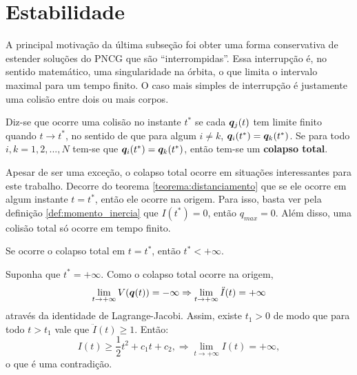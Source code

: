 \section{Estabilidade}

A principal motivação da última subseção foi obter uma forma conservativa de estender soluções do PNCG que são ``interrompidas''. Essa interrupção é, no sentido matemático, uma singularidade na órbita, o que limita o intervalo maximal para um tempo finito. O caso mais simples de interrupção é justamente uma colisão entre dois ou mais corpos.

\begin{definition}[Colisão]
    Diz-se que ocorre uma colisão no instante $t^*$ se cada $\bm q_j(t)$ tem limite finito quando $t \to t^*$, no sentido de que para algum $i \neq k$, $\bm q_i(t^*) = \bm q_k(t^*)$. Se para todo $i,k=1,2,...,N$ tem-se que $\bm q_i(t^*) = \bm q_k(t^*)$, então tem-se um \textbf{colapso total}.
\end{definition}

Apesar de ser uma exceção, o colapso total ocorre em situações interessantes para este trabalho. Decorre do teorema \ref{teorema:distanciamento} que se ele ocorre em algum instante $t = t^*$, então ele ocorre na origem. Para isso, basta ver pela definição \ref{def:momento_inercia} que $I(t^*) = 0$, então $q_{max} = 0$. Além disso, uma colisão total só ocorre em tempo finito.

\begin{proposition}
    Se ocorre o colapso total em $t=t^*$, então $t^* < +\infty$.
\end{proposition}
\begin{Proof}
    Suponha que $t^* = +\infty$. Como o colapso total ocorre na origem,
    \begin{equation*}
        \lim_{t \to +\infty} V(\bm q(t)) = - \infty
        \Rightarrow
        \lim_{t \to +\infty} \ddot I(t) = +\infty
    \end{equation*}
    através da identidade de Lagrange-Jacobi. Assim, existe $t_1 > 0$ de modo que para todo $t > t_1$ vale que $\ddot I(t) \geq 1$. Então:
    \begin{equation*}
        I(t) \geq \frac{1}{2} t^2 + c_1 t + c_2,
        \Rightarrow
        \lim_{t \to +\infty} I(t) = +\infty,
    \end{equation*}
    o que é uma contradição.
\end{Proof}

